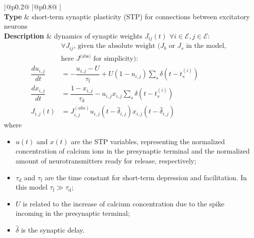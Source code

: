 \documentclass[a4paper, 12pt, twoside, openright]{book}
\newcommand{\Epop}{\mathcal{E}} %
\newcommand{\tauD}{\tau_\text{d}}
\newcommand{\tauF}{\tau_\text{f}}
\def\marg{2pt}
\begin{document}
\addtocounter{table}{-1}
\begin{table}[H]
\begin{tabular}{
  |@{\hspace*{\marg}}p{}@{\hspace*{\marg}}
  |@{\hspace*{\marg}}p{}@{\hspace*{\marg}}
  |}
  \hline 
  \\
\hline 
\textbf{Type} & short-term synaptic plasticity (STP) for connections between excitatory neurons\\
\hline 
  \textbf{Description} &
   dynamics of synaptic weights $J_{ij}(t)$ $\forall{}i\in\Epop, j\in\Epop$:
   \begin{equation*}
     \begin{aligned}
       &\forall J_{ij}\text{, given the absolute weight ($J_b$ or $J_s$ in the model,} \\ &\text{here $J^{\text{(abs)}}$ for simplicity)}: \\[1ex]
       \dfrac{du_{i,j}}{dt} &= -\dfrac{u_{i,j} - U}{\tauF} + U(1-u_{i,j})\sum_s\delta (t-t_s^{(i)}) \\
       \dfrac{dx_{i,j}}{dt} &= \dfrac{1-x_{i,j}}{\tauD} - u_{i,j}x_{i,j} \sum_s\delta (t-t_s^{(i)})\\
       J_{i,j}(t) &= J^{(abs)}_{i,j}u_{i,j}(t-\hat{\delta}_{i,j})x_{i,j}(t-\hat{\delta}_{i,j})
     \end{aligned}
   \end{equation*}
    where
    \begin{itemize}
    \item $u(t)$ and $x(t)$ are the STP variables, representing the normalized concentration of calcium ions in the presynaptic terminal and the normalized amount of neurotransmitters ready for release, respectively;
    \item $\tauD$ and $\tauF$ are the time constant for short-term depression and facilitation. In this model $\tauF\gg\tauD$;
    \item $U$ is related to the increase of calcium concentration due to the spike incoming in the presynaptic terminal;
    \item $\hat{\delta}$ is the synaptic delay.
    \end{itemize}
  \\
\hline 
\end{tabular}


\end{table}
\end{document}
